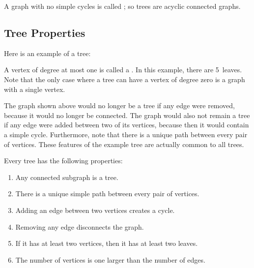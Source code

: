 A graph with no simple cycles is called ; so trees are
acyclic connected graphs.

\subsection{Tree Properties}

Here is an example of a tree:


A vertex of degree at most one is called a .  In this example, there are 5~leaves. Note 
that the only case where a tree can have a vertex of degree zero is a graph with a single
vertex.

The graph shown above would no longer be a tree if any edge were removed,
because it would no longer be connected.  The graph would also not remain
a tree if any edge were added between two of its vertices, because then it
would contain a simple cycle.  Furthermore, note that there is a unique
path between every pair of vertices.  These features of the example tree
are actually common to all trees.

\begin{theorem}\label{th:treeprops}
Every tree has the following properties:

\begin{enumerate}
\item Any connected subgraph is a tree.\label{asub}

\item There is a unique simple path between every pair of vertices.
\item Adding an edge between two vertices creates a cycle.
\item Removing any edge disconnects the graph.
\item If it has at least two vertices, then it has at least two leaves.
\item The number of vertices is one larger than the number of edges.
\end{enumerate}
\end{theorem}

